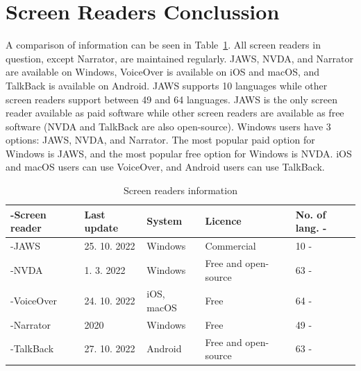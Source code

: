 \section{Screen Readers Conclussion}

A comparison of information can be seen in  Table~\ref{tab:screen-readers-info}. All screen readers in question, except Narrator, are maintained regularly. JAWS, NVDA, and Narrator are available on Windows, VoiceOver is available on iOS and macOS, and TalkBack is available on Android. JAWS supports 10 languages while other screen readers support between 49 and 64 languages. JAWS is the only screen reader available as paid software while other screen readers are available as free software (NVDA and TalkBack are also open-source). Windows users have 3 options: JAWS, NVDA, and Narrator. The most popular paid option for Windows is JAWS, and the most popular free option for Windows is NVDA. iOS and macOS users can use VoiceOver, and Android users can use TalkBack.

\begin{table}[tp]
\tablestretch
{}
\centering
\begin{tabularx}{\linewidth}
{>{\kern-\tabcolsep}lllXX<{\kern-\tabcolsep}}
\toprule
\textbf{Screen reader} & \textbf{Last update} & \textbf{System} & \textbf{Licence} & \textbf{No. of lang.} \\
\midrule
JAWS & 25. 10. 2022 & Windows & Commercial & 10 \\
%
NVDA & 1. 3. 2022 & Windows & Free and open-source & 63 \\
%
VoiceOver & 24. 10. 2022 & iOS, macOS & Free & 64 \\
%
Narrator & 2020 & Windows & Free & 49 \\
%
TalkBack & 27. 10. 2022 & Android & Free and open-source & 63 \\
\bottomrule
\end{tabularx}

\caption[Screen readers information]
{
Screen readers information
}
\label{tab:screen-readers-info}
\end{table}


